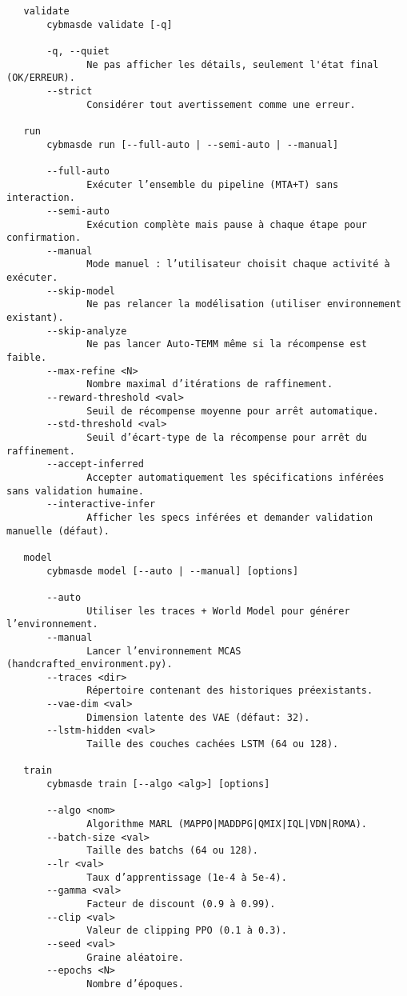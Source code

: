 \begin{verbatim}
   validate
       cybmasde validate [-q]

       -q, --quiet
              Ne pas afficher les détails, seulement l'état final (OK/ERREUR).
       --strict
              Considérer tout avertissement comme une erreur.

   run
       cybmasde run [--full-auto | --semi-auto | --manual]

       --full-auto
              Exécuter l’ensemble du pipeline (MTA+T) sans interaction.
       --semi-auto
              Exécution complète mais pause à chaque étape pour confirmation.
       --manual
              Mode manuel : l’utilisateur choisit chaque activité à exécuter.
       --skip-model
              Ne pas relancer la modélisation (utiliser environnement existant).
       --skip-analyze
              Ne pas lancer Auto-TEMM même si la récompense est faible.
       --max-refine <N>
              Nombre maximal d’itérations de raffinement.
       --reward-threshold <val>
              Seuil de récompense moyenne pour arrêt automatique.
       --std-threshold <val>
              Seuil d’écart-type de la récompense pour arrêt du raffinement.
       --accept-inferred
              Accepter automatiquement les spécifications inférées sans validation humaine.
       --interactive-infer
              Afficher les specs inférées et demander validation manuelle (défaut).

   model
       cybmasde model [--auto | --manual] [options]

       --auto
              Utiliser les traces + World Model pour générer l’environnement.
       --manual
              Lancer l’environnement MCAS (handcrafted_environment.py).
       --traces <dir>
              Répertoire contenant des historiques préexistants.
       --vae-dim <val>
              Dimension latente des VAE (défaut: 32).
       --lstm-hidden <val>
              Taille des couches cachées LSTM (64 ou 128).

   train
       cybmasde train [--algo <alg>] [options]

       --algo <nom>
              Algorithme MARL (MAPPO|MADDPG|QMIX|IQL|VDN|ROMA).
       --batch-size <val>
              Taille des batchs (64 ou 128).
       --lr <val>
              Taux d’apprentissage (1e-4 à 5e-4).
       --gamma <val>
              Facteur de discount (0.9 à 0.99).
       --clip <val>
              Valeur de clipping PPO (0.1 à 0.3).
       --seed <val>
              Graine aléatoire.
       --epochs <N>
              Nombre d’époques.


\end{verbatim}
